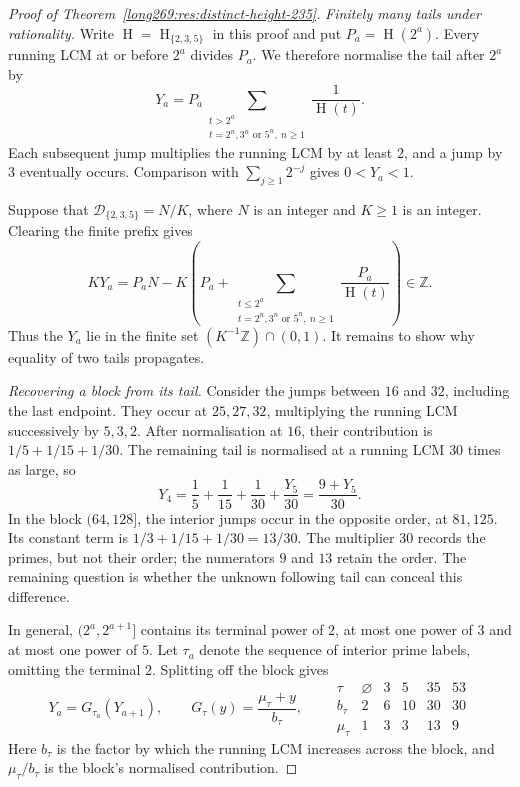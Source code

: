 \documentclass[11pt]{article}
\theoremstyle{remark}
\theoremstyle{plain}
\newcommand{\hgt}{\operatorname{H}}
\begin{document}
\begin{proof}[Proof of Theorem~\ref{long269:res:distinct-height-235}]
\emph{Finitely many tails under rationality.}
Write $\hgt=\hgt_{\{2,3,5\}}$ in this proof and put $P_a=\hgt(2^a)$.
Every running LCM at or before $2^a$ divides $P_a$. We therefore normalise
the tail after $2^a$ by
\begin{equation}\label{long269:eq:five-tail}
 Y_a=P_a\sum_{\substack{t>2^a\\t=2^n,3^n\text{ or }5^n,\ n\ge1}}
                   \frac1{\hgt(t)}.
\end{equation}
Each subsequent jump multiplies the running LCM by at least $2$, and a jump
by $3$ eventually occurs. Comparison with $\sum_{j\ge1}2^{-j}$ gives
$0<Y_a<1$.

Suppose that $\mathcal D_{\{2,3,5\}}=N/K$, where $N$ is an integer and
$K\ge1$ is an integer. Clearing the finite prefix gives
\[
 KY_a=P_aN-K\left(P_a+
        \sum_{\substack{t\le2^a\\t=2^n,3^n\text{ or }5^n,\ n\ge1}}
                 \frac{P_a}{\hgt(t)}\right)\in\mathbb Z.
\]
Thus the $Y_a$ lie in the finite set $(K^{-1}\mathbb Z)\cap(0,1)$.
It remains to show why equality of two tails propagates.

\medskip
\emph{Recovering a block from its tail.}
Consider the jumps between $16$ and $32$, including the last endpoint.
They occur at $25,27,32$, multiplying the running LCM successively by $5,3,2$.
After normalisation at $16$, their contribution is
$1/5+1/15+1/30$. The remaining tail is normalised at a running LCM $30$
times as large, so
\[
 Y_4=\frac15+\frac1{15}+\frac1{30}+\frac{Y_5}{30}
     =\frac{9+Y_5}{30}.
\]
In the block $(64,128]$, the interior jumps occur in the opposite order,
at $81,125$. Its constant term is $1/3+1/15+1/30=13/30$.
The multiplier $30$ records the primes, but not their order; the
numerators $9$ and $13$ retain the order. The remaining question is
whether the unknown following tail can conceal this difference.

In general, $(2^a,2^{a+1}]$ contains its terminal power of $2$, at most
one power of $3$ and at most one power of $5$. Let $\tau_a$ denote the
sequence of interior prime labels, omitting the terminal $2$. Splitting
off the block gives
\begin{equation}\label{long269:eq:five-maps}
 Y_a=G_{\tau_a}(Y_{a+1}),\qquad
 G_\tau(y)=\frac{\mu_\tau+y}{b_\tau},\qquad
 \begin{array}{c|ccccc}
 \tau&\varnothing&3&5&35&53\\\hline
 b_\tau&2&6&10&30&30\\
 \mu_\tau&1&3&3&13&9
 \end{array}
\end{equation}
Here $b_\tau$ is the factor by which the running LCM increases across the
block, and $\mu_\tau/b_\tau$ is the block's normalised contribution.


\end{proof}
\end{document}
